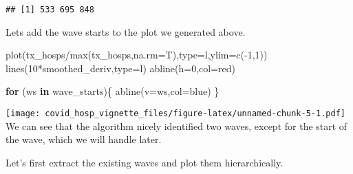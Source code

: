 \documentclass[
]{article}
\newenvironment{Shaded}{\begin{snugshade}}{\end{snugshade}}
\newcommand{\AttributeTok}[1]{\textcolor[rgb]{0.77,0.63,0.00}{#1}}
\newcommand{\ControlFlowTok}[1]{\textcolor[rgb]{0.13,0.29,0.53}{\textbf{#1}}}
\newcommand{\DecValTok}[1]{\textcolor[rgb]{0.00,0.00,0.81}{#1}}
\newcommand{\FunctionTok}[1]{\textcolor[rgb]{0.00,0.00,0.00}{#1}}
\newcommand{\NormalTok}[1]{#1}
\newcommand{\SpecialCharTok}[1]{\textcolor[rgb]{0.00,0.00,0.00}{#1}}
\newcommand{\StringTok}[1]{\textcolor[rgb]{0.31,0.60,0.02}{#1}}
\begin{document}
\begin{verbatim}
## [1] 533 695 848
\end{verbatim}

Lets add the wave starts to the plot we generated above.

\begin{Shaded}
\begin{Highlighting}[]
\FunctionTok{plot}\NormalTok{(tx\_hosps}\SpecialCharTok{/}\FunctionTok{max}\NormalTok{(tx\_hosps,}\AttributeTok{na.rm=}\NormalTok{T),}\AttributeTok{type=}\StringTok{\textquotesingle{}l\textquotesingle{}}\NormalTok{,}\AttributeTok{ylim=}\FunctionTok{c}\NormalTok{(}\SpecialCharTok{{-}}\DecValTok{1}\NormalTok{,}\DecValTok{1}\NormalTok{))}
\FunctionTok{lines}\NormalTok{(}\DecValTok{10}\SpecialCharTok{*}\NormalTok{smoothed\_deriv,}\AttributeTok{type=}\StringTok{\textquotesingle{}l\textquotesingle{}}\NormalTok{)}
\FunctionTok{abline}\NormalTok{(}\AttributeTok{h=}\DecValTok{0}\NormalTok{,}\AttributeTok{col=}\StringTok{\textquotesingle{}red\textquotesingle{}}\NormalTok{)}

\ControlFlowTok{for}\NormalTok{ (ws }\ControlFlowTok{in}\NormalTok{ wave\_starts)\{}
  \FunctionTok{abline}\NormalTok{(}\AttributeTok{v=}\NormalTok{ws,}\AttributeTok{col=}\StringTok{\textquotesingle{}blue\textquotesingle{}}\NormalTok{)}
\NormalTok{\}}
\end{Highlighting}
\end{Shaded}

\texttt{[image: covid\_hosp\_vignette\_files/figure-latex/unnamed-chunk-5-1.pdf]}
We can see that the algorithm nicely identified two waves, except for
the start of the wave, which we will handle later.

Let's first extract the existing waves and plot them hierarchically.
\end{document}
